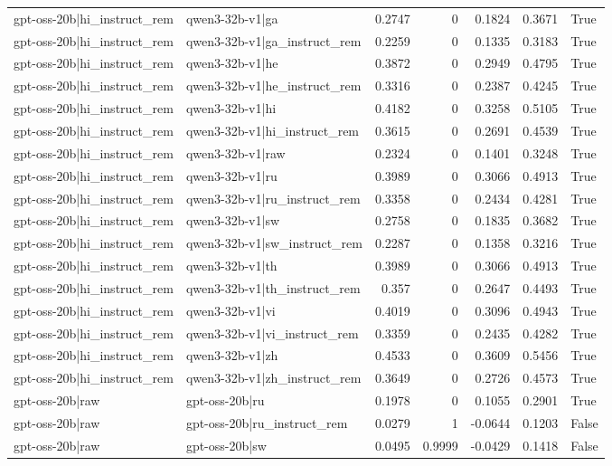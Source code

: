 \begin{table}
\begin{tabular}{l l r r r r l}
gpt-oss-20b|hi_instruct_rem & qwen3-32b-v1|ga & 0.2747 & 0 & 0.1824 & 0.3671 & True \\
gpt-oss-20b|hi_instruct_rem & qwen3-32b-v1|ga_instruct_rem & 0.2259 & 0 & 0.1335 & 0.3183 & True \\
gpt-oss-20b|hi_instruct_rem & qwen3-32b-v1|he & 0.3872 & 0 & 0.2949 & 0.4795 & True \\
gpt-oss-20b|hi_instruct_rem & qwen3-32b-v1|he_instruct_rem & 0.3316 & 0 & 0.2387 & 0.4245 & True \\
gpt-oss-20b|hi_instruct_rem & qwen3-32b-v1|hi & 0.4182 & 0 & 0.3258 & 0.5105 & True \\
gpt-oss-20b|hi_instruct_rem & qwen3-32b-v1|hi_instruct_rem & 0.3615 & 0 & 0.2691 & 0.4539 & True \\
gpt-oss-20b|hi_instruct_rem & qwen3-32b-v1|raw & 0.2324 & 0 & 0.1401 & 0.3248 & True \\
gpt-oss-20b|hi_instruct_rem & qwen3-32b-v1|ru & 0.3989 & 0 & 0.3066 & 0.4913 & True \\
gpt-oss-20b|hi_instruct_rem & qwen3-32b-v1|ru_instruct_rem & 0.3358 & 0 & 0.2434 & 0.4281 & True \\
gpt-oss-20b|hi_instruct_rem & qwen3-32b-v1|sw & 0.2758 & 0 & 0.1835 & 0.3682 & True \\
gpt-oss-20b|hi_instruct_rem & qwen3-32b-v1|sw_instruct_rem & 0.2287 & 0 & 0.1358 & 0.3216 & True \\
gpt-oss-20b|hi_instruct_rem & qwen3-32b-v1|th & 0.3989 & 0 & 0.3066 & 0.4913 & True \\
gpt-oss-20b|hi_instruct_rem & qwen3-32b-v1|th_instruct_rem & 0.357 & 0 & 0.2647 & 0.4493 & True \\
gpt-oss-20b|hi_instruct_rem & qwen3-32b-v1|vi & 0.4019 & 0 & 0.3096 & 0.4943 & True \\
gpt-oss-20b|hi_instruct_rem & qwen3-32b-v1|vi_instruct_rem & 0.3359 & 0 & 0.2435 & 0.4282 & True \\
gpt-oss-20b|hi_instruct_rem & qwen3-32b-v1|zh & 0.4533 & 0 & 0.3609 & 0.5456 & True \\
gpt-oss-20b|hi_instruct_rem & qwen3-32b-v1|zh_instruct_rem & 0.3649 & 0 & 0.2726 & 0.4573 & True \\
gpt-oss-20b|raw & gpt-oss-20b|ru & 0.1978 & 0 & 0.1055 & 0.2901 & True \\
gpt-oss-20b|raw & gpt-oss-20b|ru_instruct_rem & 0.0279 & 1 & -0.0644 & 0.1203 & False \\
gpt-oss-20b|raw & gpt-oss-20b|sw & 0.0495 & 0.9999 & -0.0429 & 0.1418 & False \\

\end{tabular}
\end{table}
